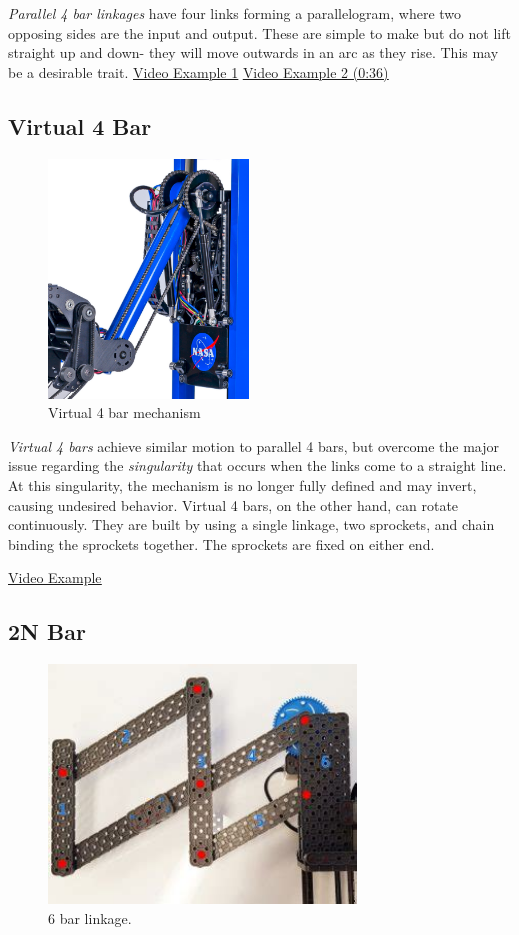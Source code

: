 \textit{Parallel 4 bar linkages} have four links forming a parallelogram, where two opposing sides are the input and output. These are simple to make but do not lift straight up and down- they will move outwards in an arc as they rise. This may be a desirable trait. \href{https://www.youtube.com/watch?v=hnxqZlG-508}{\color{red}\underline{Video Example 1}} \href{https://youtu.be/LaV0zbKz-Qg?t=36}{\color{red}\underline{Video Example 2 (0:36)}}
\subsection{Virtual 4 Bar}

\begin{figure}[H]
	\includegraphics[height=2.5in]{imgs/virtual_4bar_1.png}
	\caption{Virtual 4 bar mechanism}
\end{figure}

\textit{Virtual 4 bars} achieve similar motion to parallel 4 bars, but overcome the major issue regarding the \textit{singularity} that occurs when the links come to a straight line. At this singularity, the mechanism is no longer fully defined and may invert, causing undesired behavior. Virtual 4 bars, on the other hand, can rotate continuously. They are built by using a single linkage, two sprockets, and chain binding the sprockets together. The sprockets are fixed on either end.

\href{https://www.youtube.com/watch?v=nH6P4BcwtiE}{\color{red}\underline{Video Example}}

\subsection{2N Bar}

\begin{figure}[H]
	\includegraphics[height=2.5in]{imgs/6bar.jpeg}
	\caption{6 bar linkage.}
\end{figure}


